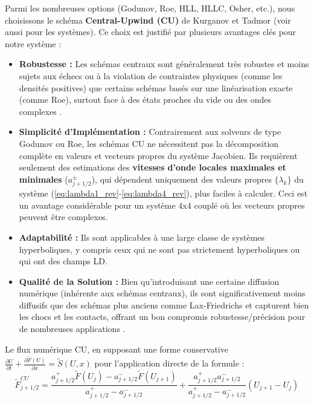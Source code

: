 Parmi les nombreuses options (Godunov, Roe, HLL, HLLC, Osher, etc.), nous choisissons le schéma \textbf{Central-Upwind (CU)} de Kurganov et Tadmor \cite{KurganovTadmor2000} (voir aussi \cite{KurganovNoellePetrova2001} pour les systèmes). Ce choix est justifié par plusieurs avantages clés pour notre système :
\begin{itemize}
    \item \textbf{Robustesse :} Les schémas centraux sont généralement très robustes et moins sujets aux échecs ou à la violation de contraintes physiques (comme les densités positives) que certains schémas basés sur une linéarisation exacte (comme Roe), surtout face à des états proches du vide ou des ondes complexes \cite{KurganovTadmor2000}.
    \item \textbf{Simplicité d'Implémentation :} Contrairement aux solveurs de type Godunov ou Roe, les schémas CU ne nécessitent pas la décomposition complète en valeurs et vecteurs propres du système Jacobien. Ils requièrent seulement des estimations des \textbf{vitesses d'onde locales maximales et minimales} (\( a_{j+1/2}^{\pm} \)), qui dépendent uniquement des valeurs propres \( \{\lambda_k\} \) du système (\ref{eq:lambda1_rev}-\ref{eq:lambda4_rev}), plus faciles à calculer. Ceci est un avantage considérable pour un système 4x4 couplé où les vecteurs propres peuvent être complexes.
    \item \textbf{Adaptabilité :} Ils sont applicables à une large classe de systèmes hyperboliques, y compris ceux qui ne sont pas strictement hyperboliques ou qui ont des champs LD.
    \item \textbf{Qualité de la Solution :} Bien qu'introduisant une certaine diffusion numérique (inhérente aux schémas centraux), ils sont significativement moins diffusifs que des schémas plus anciens comme Lax-Friedrichs et capturent bien les chocs et les contacts, offrant un bon compromis robustesse/précision pour de nombreuses applications \cite{KurganovTadmor2000}.
\end{itemize}
Le flux numérique CU, en supposant une forme conservative \( \frac{\partial U}{\partial t} + \frac{\partial \tilde{F}(U)}{\partial x} = \tilde{S}(U,x) \) pour l'application directe de la formule :
\begin{equation}
    \label{eq:cu_flux_final}
    \tilde{F}_{j+1/2}^{CU} = \frac{a_{j+1/2}^+ \tilde{F}(U_j) - a_{j+1/2}^- \tilde{F}(U_{j+1})}{a_{j+1/2}^+ - a_{j+1/2}^-} + \frac{a_{j+1/2}^+ a_{j+1/2}^-}{a_{j+1/2}^+ - a_{j+1/2}^-} (U_{j+1} - U_j)
\end{equation}
